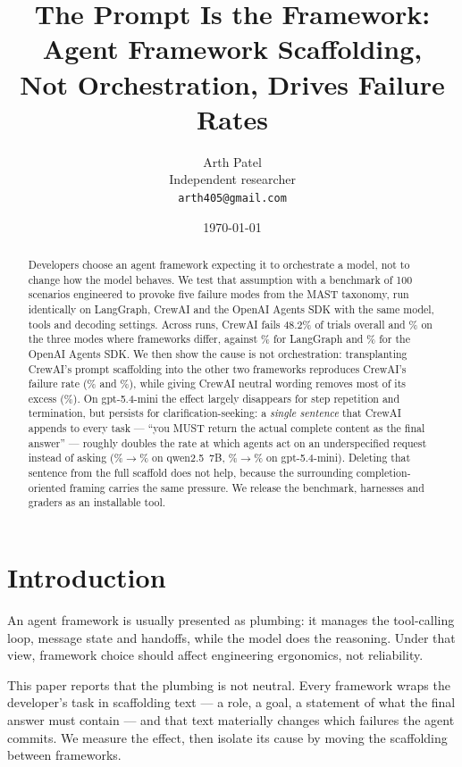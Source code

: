 \documentclass[10pt,twocolumn]{article}
\title{\bf The Prompt Is the Framework: Agent Framework Scaffolding,\\Not Orchestration, Drives Failure Rates}
\author{Arth Patel\\\small Independent researcher\\\small \texttt{arth405@gmail.com}}
\date{\today}
\begin{document}
\maketitle

\begin{abstract}
Developers choose an agent framework expecting it to orchestrate a model, not to
change how the model behaves. We test that assumption with a benchmark of 100
scenarios engineered to provoke five failure modes from the MAST taxonomy, run
identically on LangGraph, CrewAI and the OpenAI Agents SDK with the same model,
tools and decoding settings. Across \nRunsPhaseOne{} runs, CrewAI fails 48.2\%
of trials overall and \swapQcrewai\% on the three modes where frameworks
differ, against
\swapQlanggraph\% for LangGraph and \swapQopenaiagents\% for the OpenAI Agents
SDK. We then show the cause is not orchestration: transplanting CrewAI's prompt
scaffolding into the other two frameworks reproduces CrewAI's failure rate
(\swapQlgcrewprompt\% and \swapQoaicrewprompt\%), while giving CrewAI neutral
wording removes most of its excess (\swapQcrewneutral\%). On gpt-5.4-mini the
effect largely disappears for step repetition and termination, but persists for
clarification-seeking: a \emph{single sentence} that CrewAI appends to every
task --- ``you MUST return the actual complete content as the final answer''
--- roughly doubles the rate at which agents act on an underspecified request
instead of asking (\sentQlanggraph\%$\rightarrow$\sentQlgsentence\% on
qwen2.5~7B, \sentGlanggraph\%$\rightarrow$\sentGlgsentence\% on gpt-5.4-mini).
Deleting that sentence from the full scaffold does not help, because the
surrounding completion-oriented framing carries the same pressure. We release
the benchmark, harnesses and graders as an installable tool.
\end{abstract}

\section{Introduction}

An agent framework is usually presented as plumbing: it manages the tool-calling
loop, message state and handoffs, while the model does the reasoning. Under that
view, framework choice should affect engineering ergonomics, not reliability.

This paper reports that the plumbing is not neutral. Every framework wraps the
developer's task in scaffolding text --- a role, a goal, a statement of what the
final answer must contain --- and that text materially changes which failures
the agent commits. We measure the effect, then isolate its cause by moving the
scaffolding between frameworks.
\end{document}
